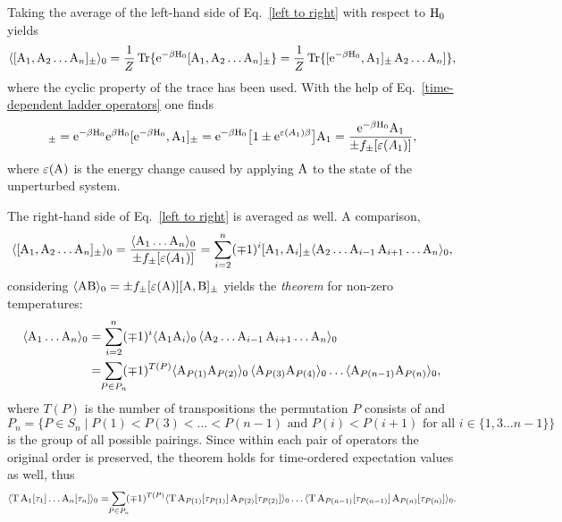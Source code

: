 Taking the average of the left-hand side of Eq.~\ref{left to right} with respect
to $\mathrm H_0$ yields
%
\begin{equation*}
    \langle[\mathrm A_1, \mathrm A_2 \dots \mathrm A_n]_\pm\rangle_0
    = \frac 1 Z \operatorname{Tr} \{
    \mathrm e^{-\beta \mathrm H_0} [ \mathrm A_1, \mathrm A_2 \dots \mathrm A_n ]_\pm \}
    = \frac 1 Z \operatorname{Tr} \{
    [\mathrm e^{-\beta \mathrm H_0}, \mathrm A_1]_\pm \, \mathrm A_2 \dots \mathrm A_n] \},
\end{equation*}
%
where the cyclic property of the trace has been used. With the help of
Eq.~\ref{time-dependent ladder operators} one finds
%
\begin{equation*}
	[\E^{-\beta \op H_0}, \op A_1]_\pm
    = \E^{-\beta \op H_0} \E^{\beta \op H_0} [\E^{-\beta \op H_0}, \op A_1]_\pm
    = \E^{-\beta \op H_0} \big[
        1 \pm \E^{\epsilon(A_1) \beta}
    \big] \op A_1
    = \frac{\E^{-\beta \op H_0} \op A_1}{\pm f_\pm[\epsilon(A_1)]},
\end{equation*}
%
where $\varepsilon(\mathrm A)$ is the energy change caused by applying $\mathrm A$ to the
state of the unperturbed system.

The right-hand side of Eq.~\ref{left to right} is averaged as well. A
comparison,
%
\begin{equation*}
    \langle[\mathrm A_1, \mathrm A_2 \dots \mathrm A_n]_\pm\rangle_0
    = \frac{\langle\mathrm A_1 \dots \mathrm A_n\rangle_0}{\pm f_\pm[\varepsilon(A_1)]}
    = \sum_{i = 2}^n (\mp 1)^i [\mathrm A_1, \mathrm A_i]_\pm
    \langle\mathrm A_2 \dots \mathrm A_{i - 1} \, \mathrm A_{i + 1} \dots \mathrm A_n\rangle_0,
\end{equation*}
%
considering $\langle\mathrm A \mathrm B\rangle_0 = \pm f_\pm[\varepsilon(\mathrm A)] [\mathrm A,
\mathrm B]_\pm$ yields the \emph{ theorem} for non-zero temperatures:
%
\begin{align*}
    \av{\op A_1 \dots \op A_n}_0 &=
    \sum_{i = 2}^n (\mp 1)^i \av{\op A_1 \op A_i}_0 \,
    \av{\op A_2 \dots \op A_{i - 1} \, \op A_{i + 1} \dots \op A_n}_0 \\
    &= \sum_{\mathclap{P \in P_n}} (\mp 1)^{T(P)}
    \av{\op A_{P(1)} \op A_{P(2)}}_0 \,
    \av{\op A_{P(3)} \op A_{P(4)}}_0 \dots
    \av{\op A_{P(n - 1)} \op A_{P(n)}}_0,
\end{align*}
%
where $T(P)$ is the number of transpositions the permutation $P$ consists of and
%
\begin{equation*}
    P_n = \{ P \in S_n \mid
        P(1) < P(3) < \dots < P(n - 1)
        \text{ and }
        P(i) < P(i + 1) \text{ for all $i \in \{1, 3 \dots n - 1\}$}
        \}
\end{equation*}
%
is the group of all possible pairings. Since within each pair of operators the
original order is preserved, the theorem holds for time-ordered expectation
values as well, thus
%
\begin{align*}
    \av{\op T \, \op A_1[\tau_1] \dots \op A_n[\tau_n]}_0 =
    \sum_{\mathclap{P \in P_n}} (\mp 1)^{T(P)}
    \av{\op T \, \op A_{P(1)}[\tau_{P(1)}] \,
    \op A_{P(2)}[\tau_{P(2)}]}_0 \dots
    \av{\op T \, \op A_{P(n - 1)}[\tau_{P(n - 1)}] \,
    \op A_{P(n)}[\tau_{P(n)}]}_0.
\end{align*}
